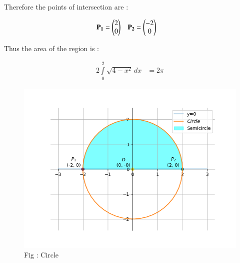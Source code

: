 \documentclass[journal,12pt,onecolumn]{IEEEtran}
\begin{document}
Therefore the points of intersection are :

\begin{align}
  \mathbf{P_1} &= \begin{pmatrix}2\\0\end{pmatrix} & \mathbf{P_2} &= \begin{pmatrix}-2\\0\end{pmatrix}
\end{align}

Thus the area of the region is :

\begin{align}
  2 \int\limits_{0}^{2}\! \sqrt{4 - x^2}\, dx &= 2\pi
\end{align}

\pagebreak

\begin{figure}[H]
  \centering
  \includegraphics[width=0.7\columnwidth]{plot.png} 
   \caption*{Fig : Circle}
  \label{Fig1}
\end{figure}
\end{document}
